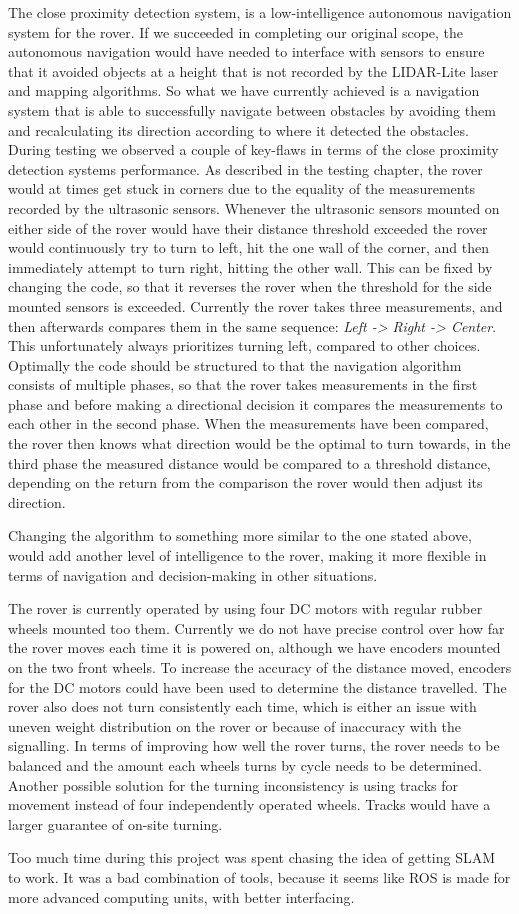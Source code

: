 The close proximity detection system, is a low-intelligence autonomous navigation system for the rover. If we succeeded in completing our original scope, the autonomous navigation would have needed to interface with sensors to ensure that it avoided objects at a height that is not recorded by the LIDAR-Lite laser and mapping algorithms. So what we have currently achieved is a navigation system that is able to successfully navigate between obstacles by avoiding them and recalculating its direction according to where it detected the obstacles.\\

During testing we observed a couple of key-flaws in terms of the close proximity detection systems performance.
As described in the testing chapter, the rover would at times get stuck in corners due to the equality of the measurements recorded by the ultrasonic sensors. Whenever the ultrasonic sensors mounted on either side of the rover would have their distance threshold exceeded the rover would continuously try to turn to left, hit the one wall of the corner, and then immediately attempt to turn right, hitting the other wall. This can be fixed by changing the code, so that it reverses the rover when the threshold for the side mounted sensors is exceeded. Currently the rover takes three measurements, and then afterwards compares them in the same sequence: \textit{Left -> Right -> Center}. This unfortunately always prioritizes turning left, compared to other choices. Optimally the code should be structured to that the navigation algorithm consists of multiple phases, so that the rover takes measurements in the first phase and before making a directional decision it compares the measurements to each other in the second phase. When the measurements have been compared, the rover then knows what direction would be the optimal to turn towards, in the third phase the measured distance would be compared to a threshold distance, depending on the return from the comparison the rover would then adjust its direction.

Changing the algorithm to something more similar to the one stated above, would add another level of intelligence to the rover, making it more flexible in terms of navigation and decision-making in other situations.

The rover is currently operated by using four DC motors with regular rubber wheels mounted too them. Currently we do not have precise control over how far the rover moves each time it is powered on, although we have encoders mounted on the two front wheels. To increase the accuracy of the distance moved, encoders for the DC motors could have been used to determine the distance travelled. The rover also does not turn consistently each time, which is either an issue with uneven weight distribution on the rover or because of inaccuracy with the signalling. In terms of improving how well the rover turns, the rover needs to be balanced and the amount each wheels turns by cycle needs to be determined. Another possible solution for the turning inconsistency is using tracks for movement instead of four independently operated wheels. Tracks would have a larger guarantee of on-site turning.

Too much time during this project was spent chasing the idea of getting SLAM to work. It was a bad combination of tools, because it seems like ROS is made for more advanced computing units, with better interfacing.